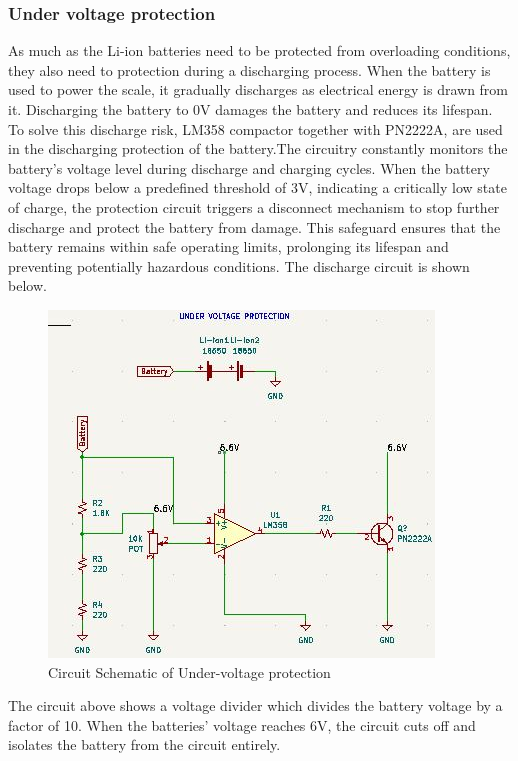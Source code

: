 \documentclass[class=report,11pt,crop=false]{standalone}
\begin{document}
	\subsubsection{Under voltage protection}
	\vspace{0.5cm}
	As much as the Li-ion batteries need to be protected from overloading conditions, they also need to protection during a discharging process. When the battery is used to power the scale, it gradually discharges as electrical energy is drawn from it. Discharging the battery to 0V damages the battery and reduces its lifespan. To solve this discharge risk, LM358 compactor together with PN2222A, are used in the discharging protection of the battery.The circuitry constantly monitors the battery's voltage level during discharge and charging cycles. When the battery voltage drops below a predefined threshold of 3V, indicating a critically low state of charge, the protection circuit triggers a disconnect mechanism to stop further discharge and protect the battery from damage. This safeguard ensures that the battery remains within safe operating limits, prolonging its lifespan and preventing potentially hazardous conditions. The discharge circuit is shown below. 
	
	\begin{figure}[h!]
		\centering
		\includegraphics[width=0.9\linewidth]{Figures/ReverseVoltageCircuit.jpg}
		\caption{Circuit Schematic of Under-voltage protection}
		\label{fig:P4}
	\end{figure}
	
	The circuit above shows a voltage divider which divides the battery voltage by a factor of 10. When the batteries' voltage reaches 6V, the circuit cuts off and isolates the battery from the circuit entirely.
	
\end{document}
